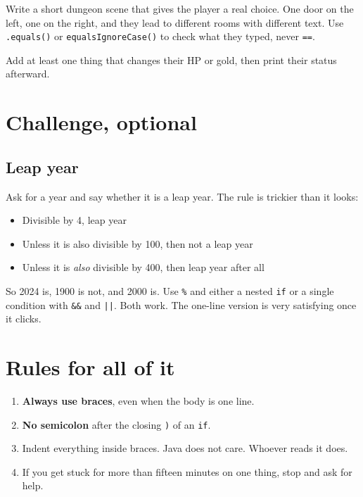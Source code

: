 \documentclass[11pt]{article}
\newcommand{\code}[1]{\texttt{#1}}
\begin{document}
Write a short dungeon scene that gives the player a real choice. One door on the left, one on the right, and they lead to different rooms with different text. Use \code{.equals()} or \code{equalsIgnoreCase()} to check what they typed, never \code{==}.

Add at least one thing that changes their HP or gold, then print their status afterward.


\section{Challenge, optional}

\subsection*{Leap year}

Ask for a year and say whether it is a leap year. The rule is trickier than it looks:

\begin{itemize}
\item Divisible by 4, leap year
\item Unless it is also divisible by 100, then not a leap year
\item Unless it is \emph{also} divisible by 400, then leap year after all
\end{itemize}

So 2024 is, 1900 is not, and 2000 is. Use \code{\%} and either a nested \code{if} or a single condition with \code{\&\&} and \code{||}. Both work. The one-line version is very satisfying once it clicks.


\section{Rules for all of it}

\begin{enumerate}
\item \textbf{Always use braces}, even when the body is one line.
\item \textbf{No semicolon} after the closing \code{)} of an \code{if}.
\item Indent everything inside braces. Java does not care. Whoever reads it does.
\item If you get stuck for more than fifteen minutes on one thing, stop and ask for help.
\end{enumerate}
\end{document}
